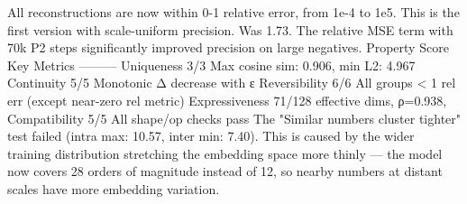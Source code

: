  All reconstructions are now within 0-1\markdownRendererPercentSign{} relative error, from 1e-4 to 1e5. This is the first version with scale-uniform precision.\markdownRendererOlItemEnd 
{} Was 1.73\markdownRendererPercentSign{}. The relative MSE term with 70k P2 steps significantly improved precision on large negatives.\markdownRendererOlItemEnd 
\markdownRendererOlEndTight \markdownRendererInterblockSeparator
{}
\markdownRendererSectionEnd \markdownRendererSectionBegin
{}\markdownRendererInterblockSeparator
{}\markdownRendererParagraphSeparator
{}\markdownRendererPipe{} Property \markdownRendererPipe{} Score \markdownRendererPipe{} Key Metrics \markdownRendererPipe{}\markdownRendererSoftLineBreak
{}\markdownRendererPipe{}---\markdownRendererPipe{}---\markdownRendererPipe{}---\markdownRendererPipe{}\markdownRendererSoftLineBreak
{}\markdownRendererPipe{} Uniqueness \markdownRendererPipe{} 3/3 \markdownRendererPipe{} Max cosine sim: 0.906, min L2: 4.967 \markdownRendererPipe{}\markdownRendererSoftLineBreak
{}\markdownRendererPipe{} Continuity \markdownRendererPipe{} 5/5 \markdownRendererPipe{} Monotonic Δ decrease with ε \markdownRendererPipe{}\markdownRendererSoftLineBreak
{}\markdownRendererPipe{} Reversibility \markdownRendererPipe{} 6/6 \markdownRendererPipe{} All groups < 1\markdownRendererPercentSign{} rel err (except near-zero rel metric) \markdownRendererPipe{}\markdownRendererSoftLineBreak
{}\markdownRendererPipe{} Expressiveness \markdownRendererPipe{}  \markdownRendererPipe{} 71/128 effective dims, ρ=0.938,  \markdownRendererPipe{}\markdownRendererSoftLineBreak
{}\markdownRendererPipe{} Compatibility \markdownRendererPipe{} 5/5 \markdownRendererPipe{} All shape/op checks pass \markdownRendererPipe{}\markdownRendererParagraphSeparator
{} The "Similar numbers cluster tighter" test failed (intra max: 10.57, inter min: 7.40). This is caused by the wider training distribution stretching the embedding space more thinly — the model now covers 28 orders of magnitude instead of 12, so nearby numbers at distant scales have more embedding variation.\markdownRendererInterblockSeparator
